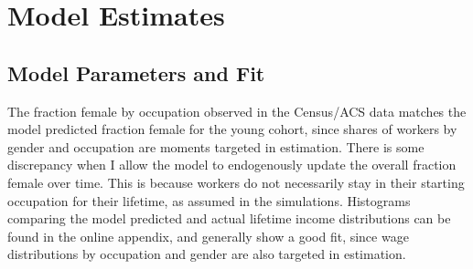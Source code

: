 \documentclass[12pt]{article}
\begin{document}


\section{Model Estimates} \label{results}
\subsection{Model Parameters and Fit}



The fraction female by occupation observed in the Census/ACS data matches the model predicted fraction female for the young cohort, since shares of workers by gender and occupation are moments targeted in estimation. There is some discrepancy when I allow the model to endogenously update the overall fraction female over time. This is because workers do not necessarily stay in their starting occupation for their lifetime, as assumed in the simulations. Histograms comparing the model predicted and actual lifetime income distributions can be found in the online appendix, and generally show a good fit, since wage distributions by occupation and gender are also targeted in estimation.

\end{document}
